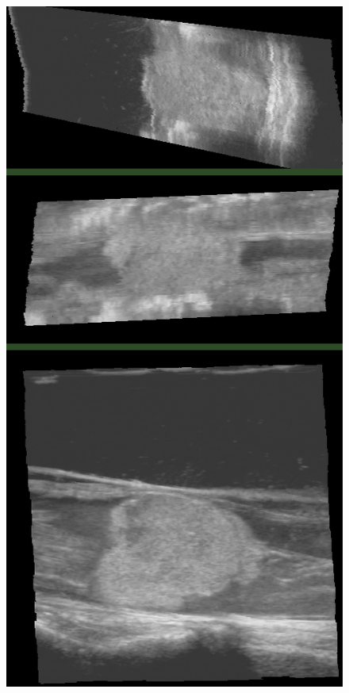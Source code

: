 \begin{figure}
\begin{minipage}[b]{0.326\textwidth}
	\label{fig:large_overwrite}
\end{minipage}
\hspace{0.01\textwidth}
\begin{minipage}[b]{0.326\textwidth}
	\centering
	\includegraphics[width=\textwidth]{graphics/large_avg.png}

\end{minipage}
\end{figure}
